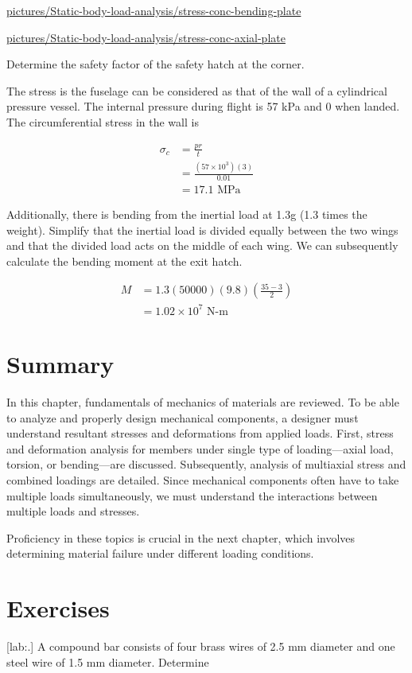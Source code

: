 \documentclass[a4paper,openany,12pt]{book}
\begin{document}
\url{pictures/Static-body-load-analysis/stress-conc-bending-plate}


\url{pictures/Static-body-load-analysis/stress-conc-axial-plate}

Determine the safety factor of the safety hatch at the corner.

The stress is the fuselage can be considered as that of the wall of a
cylindrical pressure vessel. The internal pressure during flight is 57
kPa and 0 when landed. The circumferential stress in the wall is

$$\begin{aligned}
    \sigma_c &= \frac{pr}{t} \\
             &= \frac{(57 \times 10^3)(3)}{0.01} \\
             &= 17.1 \text{ MPa}
  \end{aligned}$$

Additionally, there is bending from the inertial load at 1.3g (1.3 times
the weight). Simplify that the inertial load is divided equally between
the two wings and that the divided load acts on the middle of each wing.
We can subsequently calculate the bending moment at the exit hatch.

$$\begin{aligned}
    M &= 1.3(50000)(9.8) \left( \frac{35-3}{2} \right) \\
      &= 1.02 \times 10^7 \text{ N-m}
  \end{aligned}$$

\section{Summary}
\label{summary-2}
In this chapter, fundamentals of mechanics of materials are reviewed. To
be able to analyze and properly design mechanical components, a designer
must understand resultant stresses and deformations from applied loads.
First, stress and deformation analysis for members under single type of
loading---axial load, torsion, or bending---are discussed. Subsequently,
analysis of multiaxial stress and combined loadings are detailed. Since
mechanical components often have to take multiple loads simultaneously,
we must understand the interactions between multiple loads and stresses.

Proficiency in these topics is crucial in the next chapter, which
involves determining material failure under different loading
conditions.

\section{Exercises}
\label{exercises-2}
[lab:.] A compound bar consists of
four brass wires of 2.5 mm diameter and one steel wire of 1.5 mm
diameter. Determine
\end{document}
